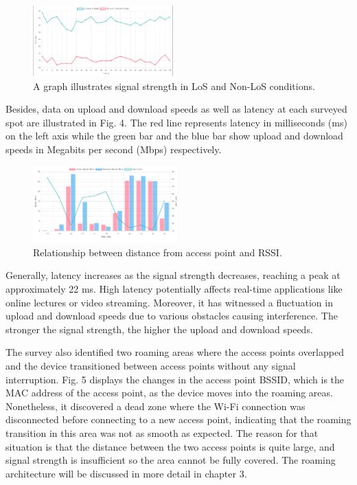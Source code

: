\documentclass[conference]{IEEEtran}
\begin{document}
\begin{figure}[htbp]
    \centering
    \includegraphics[width=0.48\textwidth]{los_nonlos.png}
    \caption{A graph illustrates signal strength in LoS and Non-LoS conditions.}
    \label{fig:los_nonlos}
\end{figure}

Besides, data on upload and download speeds as well as latency at each surveyed spot are illustrated in Fig. 4. The red line represents latency in milliseconds (ms) on the left axis while the green bar and the blue bar show upload and download speeds in Megabits per second (Mbps) respectively.


\begin{figure}[htbp]
    \centering
    \includegraphics[width=0.5\textwidth]{speech_test.png}
    \caption{Relationship between distance from access point and RSSI.}
\end{figure}

Generally, latency increases as the signal strength decreases, reaching a peak at approximately 22 ms. High latency potentially affects real-time applications like online lectures or video streaming. Moreover, it has witnessed a fluctuation in upload and download speeds due to various obstacles causing interference. The stronger the signal strength, the higher the upload and download speeds.

The survey also identified two roaming areas where the access points overlapped and the device transitioned between access points without any signal interruption. Fig. 5 displays the changes in the access point BSSID, which is the MAC address of the access point, as the device moves into the roaming areas. Nonetheless, it discovered a dead zone where the Wi-Fi connection was disconnected before connecting to a new access point, indicating that the roaming transition in this area was not as smooth as expected. The reason for that situation is that the distance between the two access points is quite large, and signal strength is insufficient so the area cannot be fully covered. The roaming architecture will be discussed in more detail in chapter 3.
\end{document}
